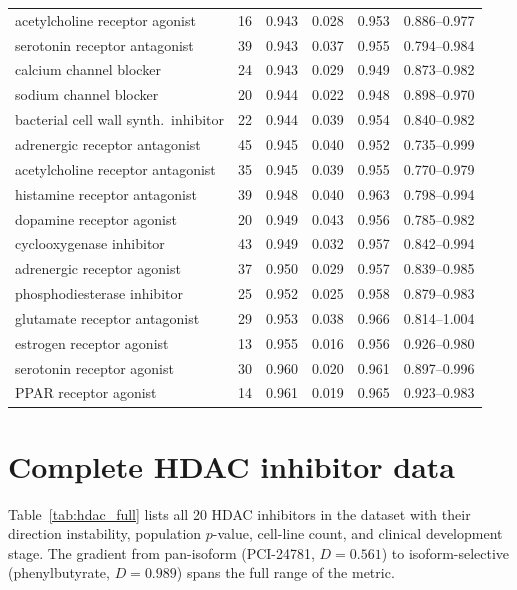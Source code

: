 \documentclass[11pt]{article}
\begin{document}
\begin{table}[h]
\begin{tabular}{lrrrrr}
acetylcholine receptor agonist & 16 & 0.943 & 0.028 & 0.953 & 0.886--0.977 \\
serotonin receptor antagonist & 39 & 0.943 & 0.037 & 0.955 & 0.794--0.984 \\
calcium channel blocker & 24 & 0.943 & 0.029 & 0.949 & 0.873--0.982 \\
sodium channel blocker & 20 & 0.944 & 0.022 & 0.948 & 0.898--0.970 \\
bacterial cell wall synth.\ inhibitor & 22 & 0.944 & 0.039 & 0.954 & 0.840--0.982 \\
adrenergic receptor antagonist & 45 & 0.945 & 0.040 & 0.952 & 0.735--0.999 \\
acetylcholine receptor antagonist & 35 & 0.945 & 0.039 & 0.955 & 0.770--0.979 \\
histamine receptor antagonist & 39 & 0.948 & 0.040 & 0.963 & 0.798--0.994 \\
dopamine receptor agonist & 20 & 0.949 & 0.043 & 0.956 & 0.785--0.982 \\
cyclooxygenase inhibitor & 43 & 0.949 & 0.032 & 0.957 & 0.842--0.994 \\
adrenergic receptor agonist & 37 & 0.950 & 0.029 & 0.957 & 0.839--0.985 \\
phosphodiesterase inhibitor & 25 & 0.952 & 0.025 & 0.958 & 0.879--0.983 \\
glutamate receptor antagonist & 29 & 0.953 & 0.038 & 0.966 & 0.814--1.004 \\
estrogen receptor agonist & 13 & 0.955 & 0.016 & 0.956 & 0.926--0.980 \\
serotonin receptor agonist & 30 & 0.960 & 0.020 & 0.961 & 0.897--0.996 \\
PPAR receptor agonist & 14 & 0.961 & 0.019 & 0.965 & 0.923--0.983 \\
\bottomrule
\end{tabular}
\end{table}

\section{Complete HDAC inhibitor data}
\label{app:hdac}

Table~\ref{tab:hdac_full} lists all 20 HDAC inhibitors in the dataset with
their direction instability, population $p$-value, cell-line count, and
clinical development stage. The gradient from pan-isoform (PCI-24781,
$D = 0.561$) to isoform-selective (phenylbutyrate, $D = 0.989$) spans the
full range of the metric.
\end{document}
